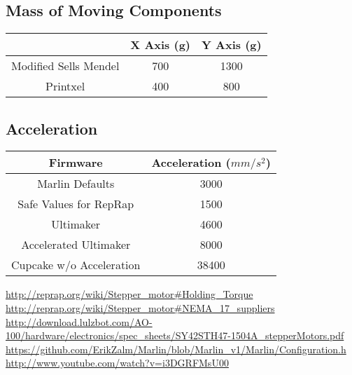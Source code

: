 \documentclass[12pt,letterpaper]{report}
\begin{document}
\subsection*{Mass of Moving Components}
\begin{tabular}{c|c|c}
& X Axis (g) & Y Axis (g) \\ 
\hline 
Modified Sells Mendel & 700 & 1300 \\ 
\hline 
Printxel & 400 & 800 \\ 
\end{tabular}

\subsection*{Acceleration}
\begin{tabular}{c|c}
Firmware & Acceleration ($mm/s^2$) \\
\hline
Marlin Defaults \cite{marlin} & 3000 \\
\hline
Safe Values for RepRap & 1500 \\
\hline
Ultimaker & 4600 \\
\hline
Accelerated Ultimaker \cite{ultimax} & 8000 \\
\hline
Cupcake w/o Acceleration & 38400 \\
\end{tabular}

\begin{thebibliography}{99}
 \url{http://reprap.org/wiki/Stepper_motor#Holding_Torque}
 \url{http://reprap.org/wiki/Stepper_motor#NEMA_17_suppliers}
 \url{http://download.lulzbot.com/AO-100/hardware/electronics/spec_sheets/SY42STH47-1504A_stepperMotors.pdf}
 \url{https://github.com/ErikZalm/Marlin/blob/Marlin_v1/Marlin/Configuration.h}
 \url{http://www.youtube.com/watch?v=i3DGRFMsU00}
\end{thebibliography}
\end{document}
